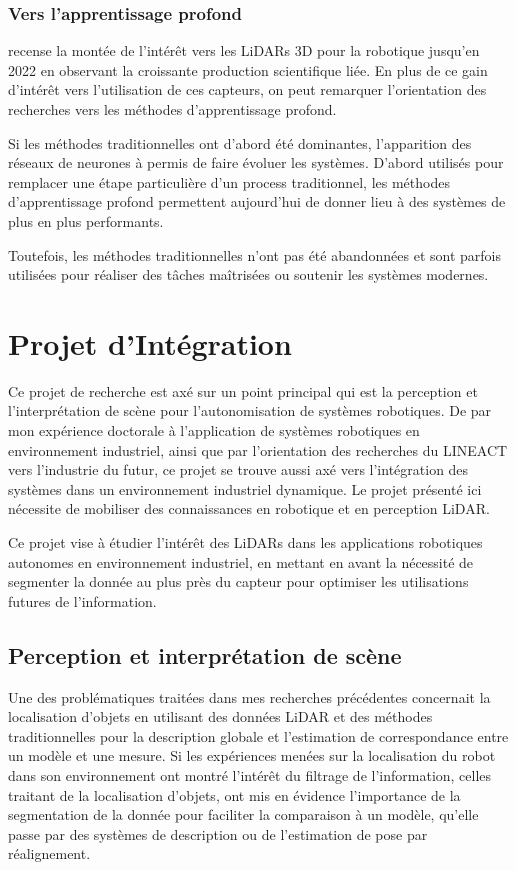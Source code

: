 \documentclass[a4paper, french, 10pt, onecolumn, notitlepage, roman]{article}
\begin{document}
\subsubsection{Vers l'apprentissage profond}
\cite{yang:arxiv:2022} recense la montée de l'intérêt vers les LiDARs 3D pour la robotique jusqu'en 2022 en observant la croissante production scientifique liée.
En plus de ce gain d'intérêt vers l'utilisation de ces capteurs, on peut remarquer l'orientation des recherches vers les méthodes d'apprentissage profond.

Si les méthodes traditionnelles ont d'abord été dominantes, l'apparition des réseaux de neurones à permis de faire évoluer les systèmes.
D'abord utilisés pour remplacer une étape particulière d'un process traditionnel, les méthodes d'apprentissage profond permettent aujourd'hui de donner lieu à des systèmes de plus en plus performants.

Toutefois, les méthodes traditionnelles n'ont pas été abandonnées et sont parfois utilisées pour réaliser des tâches maîtrisées ou soutenir les systèmes modernes.

\section{Projet d'Intégration}

Ce projet de recherche est axé sur un point principal qui est la perception et l'interprétation de scène pour l'autonomisation de systèmes robotiques.
De par mon expérience doctorale à l'application de systèmes robotiques en environnement industriel, ainsi que par l'orientation des recherches du LINEACT vers l'industrie du futur, ce projet se trouve aussi axé vers l'intégration des systèmes dans un environnement industriel dynamique.
Le projet présenté ici nécessite de mobiliser des connaissances en robotique et en perception LiDAR.

Ce projet vise à étudier l'intérêt des LiDARs dans les applications robotiques autonomes en environnement industriel, en mettant en avant la nécessité de segmenter la donnée au plus près du capteur pour optimiser les utilisations futures de l'information.

\subsection{Perception et interprétation de scène}
Une des problématiques traitées dans mes recherches précédentes concernait la localisation d'objets en utilisant des données LiDAR et des méthodes traditionnelles pour la description globale et l'estimation de correspondance entre un modèle et une mesure.
Si les expériences menées sur la localisation du robot dans son environnement ont montré l'intérêt du filtrage de l'information, celles traitant de la localisation d'objets, ont mis en évidence l'importance de la segmentation de la donnée pour faciliter la comparaison à un modèle, qu'elle passe par des systèmes de description ou de l'estimation de pose par réalignement.
\end{document}
